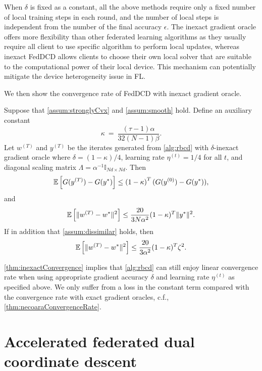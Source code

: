 When $\delta$ is fixed as a constant, all the above methods require only a fixed number of local training steps in each round, and the number of local steps is independent from the number of the final accuracy $\epsilon$. 
The inexact gradient oracle offers more flexibility than other federated learning algorithms as they usually require all client to use specific algorithm to perform local updates, whereas inexact FedDCD allows clients to choose their own local solver that are suitable to the computational power of their local device. This mechanism can potentially mitigate the device heterogeneity issue in FL.

We then show the convergence rate of FedDCD with inexact gradient oracle.
\begin{theorem} \label{thm:inexactConvergence}
    Suppose that \autoref{assum:stronglyCvx} and \autoref{assum:smooth} hold. Define an auxiliary constant
    \[\kappa ~=~ \frac{ (\tau-1) \alpha}{32 (N-1) \beta}.\]
    Let $w^{(T)}$ and $y^{(T)}$ be the iterates generated from \autoref{alg:rbcd} with $\delta$-inexact gradient oracle where $\delta=(1-\kappa)/4$, learning rate $\eta^{(t)} = 1/4$ for all $t$, and diagonal scaling matrix $\Lambda = \alpha^{-1} \mathbb{I}_{Nd \times Nd}$. Then
    \begin{equation} \label{eq:InexactDualConvergenceStrongCVX}
        \mathbb{E} \left[ G( y^{(T)} ) - G( y^* ) \right] \leq \left( 1 - \kappa \right)^{T} ( G(y^{(0)}) - G(y^*)  ), 
    \end{equation}
    and
    \begin{equation} \label{eq:InexactPrimalConvergenceStrongCVX}
        \mathbb{E} \left[ \| w^{(T)} - w^* \|^2 \right] \leq \frac{20}{3N\alpha^2}(1-\kappa)^T  \|y^*\|^2. 
    \end{equation}
    If in addition that \autoref{assum:dissimilar} holds, then
    \[\mathbb{E} \left[ \| w^{(T)} - w^* \|^2 \right] \leq \frac{20}{3\alpha^2}(1-\kappa)^T \zeta^2.\]
\end{theorem}

\autoref{thm:inexactConvergence} implies that \autoref{alg:rbcd} can still enjoy linear convergence rate when using appropriate gradient accuracy $\delta$ and learning rate $\eta^{(t)}$ as specified above. We only suffer from a loss in the constant term compared with the convergence rate with exact gradient oracles, c.f., \autoref{thm:necoaraConvergenceRate}.

\section{Accelerated federated dual coordinate descent}
\label{sec:accFedDCD}

